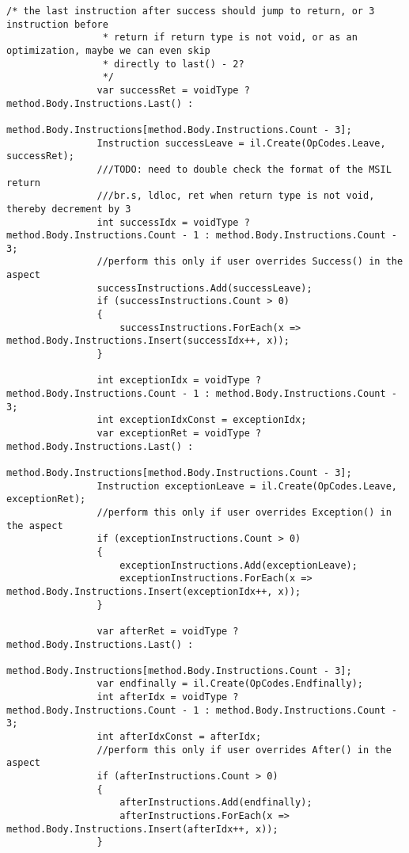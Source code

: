 \begin{lstlisting}[caption={../buffalo/Injectors/MethodBoundaryInjector.cs}, label=../buffalo/Injectors/MethodBoundaryInjector.cs, frame=tb, basicstyle=\scriptsize]
                /* the last instruction after success should jump to return, or 3 instruction before
                 * return if return type is not void, or as an optimization, maybe we can even skip
                 * directly to last() - 2?
                 */
                var successRet = voidType ? method.Body.Instructions.Last() :
                    method.Body.Instructions[method.Body.Instructions.Count - 3];
                Instruction successLeave = il.Create(OpCodes.Leave, successRet);
                ///TODO: need to double check the format of the MSIL return
                ///br.s, ldloc, ret when return type is not void, thereby decrement by 3
                int successIdx = voidType ? method.Body.Instructions.Count - 1 : method.Body.Instructions.Count - 3;
                //perform this only if user overrides Success() in the aspect
                successInstructions.Add(successLeave);
                if (successInstructions.Count > 0)
                {
                    successInstructions.ForEach(x => method.Body.Instructions.Insert(successIdx++, x));
                }

                int exceptionIdx = voidType ? method.Body.Instructions.Count - 1 : method.Body.Instructions.Count - 3;
                int exceptionIdxConst = exceptionIdx;
                var exceptionRet = voidType ? method.Body.Instructions.Last() :
                    method.Body.Instructions[method.Body.Instructions.Count - 3];
                Instruction exceptionLeave = il.Create(OpCodes.Leave, exceptionRet);
                //perform this only if user overrides Exception() in the aspect
                if (exceptionInstructions.Count > 0)
                {
                    exceptionInstructions.Add(exceptionLeave);
                    exceptionInstructions.ForEach(x => method.Body.Instructions.Insert(exceptionIdx++, x));
                }

                var afterRet = voidType ? method.Body.Instructions.Last() :
                    method.Body.Instructions[method.Body.Instructions.Count - 3];
                var endfinally = il.Create(OpCodes.Endfinally);
                int afterIdx = voidType ? method.Body.Instructions.Count - 1 : method.Body.Instructions.Count - 3;
                int afterIdxConst = afterIdx;
                //perform this only if user overrides After() in the aspect
                if (afterInstructions.Count > 0)
                {
                    afterInstructions.Add(endfinally);
                    afterInstructions.ForEach(x => method.Body.Instructions.Insert(afterIdx++, x));
                }


\end{lstlisting}
